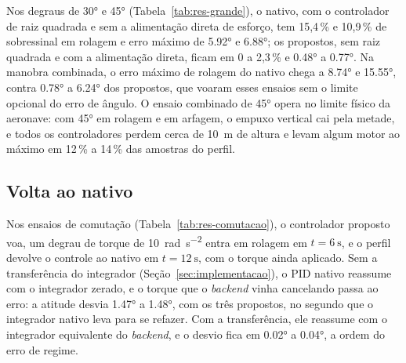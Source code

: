 \begin{table}[htbp]
\centering
\caption{Saturação em guinada: degrau curto além da autoridade e degrau perto dela.}
\label{tab:res-saturacao}
\small
\resizebox{\textwidth}{!}{}

\end{table}

Nos degraus de \ang{30} e \ang{45} (Tabela~\ref{tab:res-grande}), o nativo,
com o controlador de raiz quadrada e sem a alimentação direta de esforço, tem
15,4\,\% e 10,9\,\% de sobressinal em rolagem e erro máximo de \ang{5.92} e
\ang{6.88}; os propostos, sem raiz quadrada e com a alimentação direta,
ficam em 0 a 2,3\,\% e \ang{0.48} a \ang{0.77}. Na manobra combinada, o erro
máximo de rolagem do nativo chega a \ang{8.74} e \ang{15.55}, contra
\ang{0.78} a \ang{6.24} dos propostos, que voaram esses ensaios sem o limite
opcional do erro de ângulo. O ensaio combinado de \ang{45} opera no limite
físico da aeronave: com \ang{45} em rolagem e em arfagem, o empuxo vertical
cai pela metade, e todos os controladores perdem cerca de \SI{10}{\metre} de
altura e levam algum motor ao máximo em 12\,\% a 14\,\% das amostras do
perfil.

\begin{table}[htbp]
\centering
\caption{Degraus de atitude grandes: só rolagem e manobra combinada com
\ang{90} em guinada.}
\label{tab:res-grande}
\small
\resizebox{\textwidth}{!}{}

\nota{\raggedright }
\end{table}

\subsection{Volta ao nativo}
\label{sec:res-comutacao}

Nos ensaios de comutação (Tabela~\ref{tab:res-comutacao}), o controlador
proposto voa, um degrau de torque de \SI{10}{\radian\per\second\squared}
entra em rolagem em $t = \SI{6}{\second}$, e o perfil devolve o controle ao
nativo em $t = \SI{12}{\second}$, com o torque ainda aplicado. Sem a transferência do integrador
(Seção~\ref{sec:implementacao}), o PID nativo reassume com o integrador
zerado, e o torque que o \textit{backend} vinha cancelando passa ao erro: a
atitude desvia \ang{1.47} a \ang{1.48}, com os três propostos, no segundo
que o integrador nativo leva para se refazer. Com a transferência, ele
reassume com o integrador equivalente do \textit{backend}, e o desvio fica
em \ang{0.02} a \ang{0.04}, a ordem do erro de regime.

